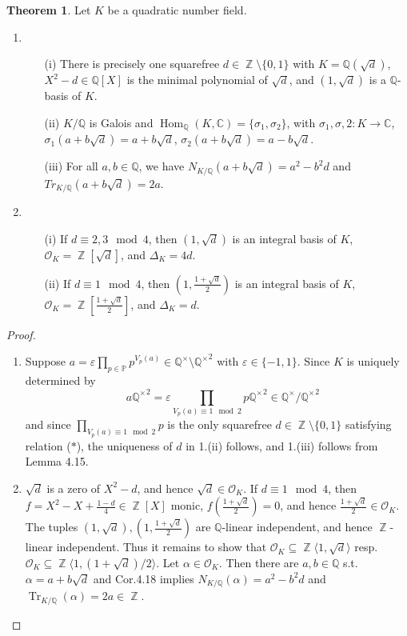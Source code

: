 \documentclass[12pt,a4paper]{report}
\theoremstyle{definition}
\newtheorem{theorem}{Theorem}[chapter] %
\theoremstyle{num.custom-title}
\DeclareMathOperator{\Hom}{Hom}
\DeclareMathOperator{\Z}{\mathbb{Z}}
\DeclareMathOperator{\sm}{\setminus}
\DeclareMathOperator{\sse}{\subseteq}
\DeclareMathOperator{\Tr}{Tr}
\newcommand{\C}{\mathbb{C}}
\newcommand{\Q}{\mathbb{Q}}
\renewcommand{\epsilon}{\varepsilon}
\renewcommand{\O}{\mathcal{O}}
\renewcommand{\P}{\mathbb{P}}
\begin{document}
\begin{theorem}
Let $K$ be a quadratic number field.
\begin{enumerate}
\item
\begin{itemize}
\item[(i)] There is precisely one squarefree $d \in \Z \sm \{0,1\}$ with $K=\Q(\sqrt{d})$, $X^2-d \in \Q[X]$ is the minimal polynomial of $\sqrt{d}$, and $(1,\sqrt{d})$ is a $\Q$-basis of $K$.
\item[(ii)] $K/\Q$ is Galois and $\Hom_\Q(K,\C)=\{\sigma_1,\sigma_2\}$, with $\sigma_1,\sigma,2 : K \to \C$, $\sigma_1(a+b\sqrt{d})=a+b\sqrt{d}$, $\sigma_2(a+b\sqrt{d})=a-b\sqrt{d}$.
\item[(iii)] For all $a,b \in \Q$, we have $N_{K/\Q}(a+b\sqrt{d}) = a^2-b^2 d$ and $Tr_{K/\Q}(a+b\sqrt{d})=2a$.
\end{itemize}
\item
\begin{itemize}
\item[(i)] If $d \equiv 2,3 \mod 4$, then $(1,\sqrt{d})$ is an integral basis of $K$, $\O_K = \Z[\sqrt{d}]$, and $\Delta_K=4d$.
\item[(ii)] If $d \equiv 1 \mod 4$, then $(1,\frac{1+\sqrt{d}}{2})$ is an integral basis of $K$, $\O_K=\Z[\frac{1+\sqrt{d}}{2}]$, and $\Delta_K=d$.
\end{itemize}
\end{enumerate}
\begin{proof}\ 
\begin{enumerate}
\item Suppose $a= \epsilon \prod_{p \in \P} p^{V_p(a)} \in \Q^\times \sm {\Q^\times}^2$ with $\epsilon \in \{-1,1\}$. Since $K$ is uniquely determined by
\[
\quad a{\Q^\times}^2 = \epsilon \prod_{V_p(a) \equiv 1 \mod 2} p {\Q^\times}^2 \in \Q^\times / {\Q^\times}^2 \tag{$*$}
\]
and since $\prod\limits_{V_p(a) \equiv 1 \mod 2} p$ is the only squarefree $d \in \Z \sm \{0,1\}$ satisfying relation ($*$), the uniqueness of $d$ in 1.(ii) follows, and 1.(iii) follows from Lemma 4.15.
\item $\sqrt{d}$ is a zero of $X^2-d$, and hence $\sqrt{d} \in \O_K$. If $d \equiv 1 \mod 4$, then $f=X^2-X+\frac{1-d}{4} \in \Z[X]$ monic, $f(\frac{1+\sqrt{d}}{2})=0$, and hence $\frac{1+\sqrt{d}}{2} \in \O_K$. The tuples $(1,\sqrt{d}), (1,\frac{1+\sqrt{d}}{2})$ are $\Q$-linear independent, and hence $\Z$-linear independent. Thus it remains to show that $\O_K \sse \Z \langle 1,\sqrt{d} \rangle$ resp. $\O_K \sse \Z \langle 1,(1+\sqrt{d})/2 \rangle$. Let $\alpha \in \O_K$. Then there are $a,b \in \Q$ s.t. $\alpha= a+b\sqrt{d}$ and Cor.4.18 implies $N_{K/\Q}(\alpha)=a^2-b^2d$ and $\Tr_{K/\Q}(\alpha)=2a \in \Z$.\\

\end{enumerate}
\end{proof}
\end{theorem}
\end{document}
